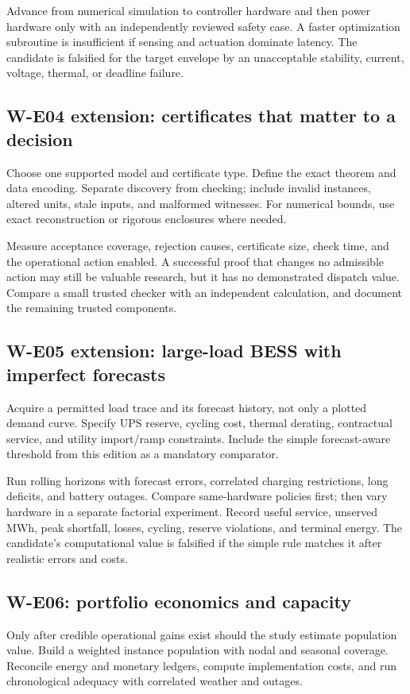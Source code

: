 \documentclass[11pt,letterpaper]{article}
\begin{document}
Advance from numerical simulation to controller hardware and then power hardware only with an independently reviewed safety case. A faster optimization subroutine is insufficient if sensing and actuation dominate latency. The candidate is falsified for the target envelope by an unacceptable stability, current, voltage, thermal, or deadline failure.

\subsection{W-E04 extension: certificates that matter to a decision}
Choose one supported model and certificate type. Define the exact theorem and data encoding. Separate discovery from checking; include invalid instances, altered units, stale inputs, and malformed witnesses. For numerical bounds, use exact reconstruction or rigorous enclosures where needed.

Measure acceptance coverage, rejection causes, certificate size, check time, and the operational action enabled. A successful proof that changes no admissible action may still be valuable research, but it has no demonstrated dispatch value. Compare a small trusted checker with an independent calculation, and document the remaining trusted components.

\subsection{W-E05 extension: large-load BESS with imperfect forecasts}
Acquire a permitted load trace and its forecast history, not only a plotted demand curve. Specify UPS reserve, cycling cost, thermal derating, contractual service, and utility import/ramp constraints. Include the simple forecast-aware threshold from this edition as a mandatory comparator.

Run rolling horizons with forecast errors, correlated charging restrictions, long deficits, and battery outages. Compare same-hardware policies first; then vary hardware in a separate factorial experiment. Record useful service, unserved MWh, peak shortfall, losses, cycling, reserve violations, and terminal energy. The candidate's computational value is falsified if the simple rule matches it after realistic errors and costs.

\subsection{W-E06: portfolio economics and capacity}
Only after credible operational gains exist should the study estimate population value. Build a weighted instance population with nodal and seasonal coverage. Reconcile energy and monetary ledgers, compute implementation costs, and run chronological adequacy with correlated weather and outages.
\end{document}
